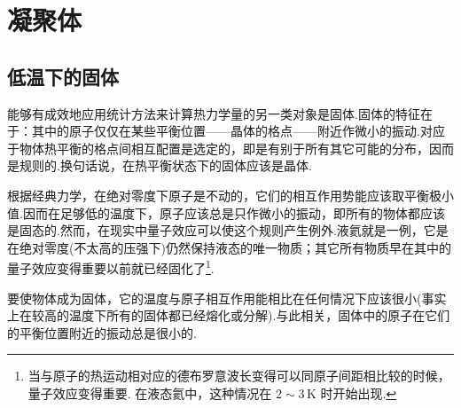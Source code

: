 \chapter{凝聚体}

\section{低温下的固体}

能够有成效地应用统计方法来计算热力学量的另一类对象是固体.固体的特征在于：其中的原子仅仅在某些平衡位置——晶体的格点——附近作微小的振动.对应于物体热平衡的格点间相互配置是选定的，即是有别于所有其它可能的分布，因而是规则的.换句话说，在热平衡状态下的固体应该是晶体.

根据经典力学，在绝对零度下原子是不动的，它们的相互作用势能应该取平衡极小值.因而在足够低的温度下，原子应该总是只作微小的振动，即所有的物体都应该是固态的.然而，在现实中量子效应可以使这个规则产生例外.液氦就是一例，它是在绝对零度(不太高的压强下)仍然保持液态的唯一物质；其它所有物质早在其中的量子效应变得重要以前就已经固化了\footnote{当与原子的热运动相对应的德布罗意波长变得可以同原子间距相比较的时候，量子效应变得重要. 在液态氦中，这种情况在 $2\sim3\,\mathrm{K}$ 时开始出现.}.

要使物体成为固体，它的温度与原子相互作用能相比在任何情况下应该很小(事实上在较高的温度下所有的固体都已经熔化或分解).与此相关，固体中的原子在它们的平衡位置附近的振动总是很小的.

